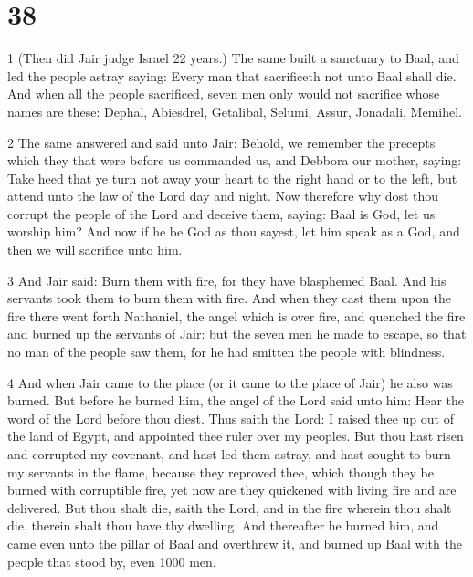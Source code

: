 \chapter{38}

\par 1 (Then did Jair judge Israel 22 years.) The same built a sanctuary to Baal, and led the people astray saying: Every man that sacrificeth not unto Baal shall die. And when all the people sacrificed, seven men only would not sacrifice whose names are these: Dephal, Abiesdrel, Getalibal, Selumi, Assur, Jonadali, Memihel. 

\par 2 The same answered and said unto Jair: Behold, we remember the precepts which they that were before us commanded us, and Debbora our mother, saying: Take heed that ye turn not away your heart to the right hand or to the left, but attend unto the law of the Lord day and night. Now therefore why dost thou corrupt the people of the Lord and deceive them, saying: Baal is God, let us worship him? And now if he be God as thou sayest, let him speak as a God, and then we will sacrifice unto him. 

\par 3 And Jair said: Burn them with fire, for they have blasphemed Baal. And his servants took them to burn them with fire. And when they cast them upon the fire there went forth Nathaniel, the angel which is over fire, and quenched the fire and burned up the servants of Jair: but the seven men he made to escape, so that no man of the people saw them, for he had smitten the people with blindness. 

\par 4 And when Jair came to the place (or it came to the place of Jair) he also was burned. But before he burned him, the angel of the Lord said unto him: Hear the word of the Lord before thou diest. Thus saith the Lord: I raised thee up out of the land of Egypt, and appointed thee ruler over my peoples. But thou hast risen and corrupted my covenant, and hast led them astray, and hast sought to burn my servants in the flame, because they reproved thee, which though they be burned with corruptible fire, yet now are they quickened with living fire and are delivered. But thou shalt die, saith the Lord, and in the fire wherein thou shalt die, therein shalt thou have thy dwelling. And thereafter he burned him, and came even unto the pillar of Baal and overthrew it, and burned up Baal with the people that stood by, even 1000 men.

